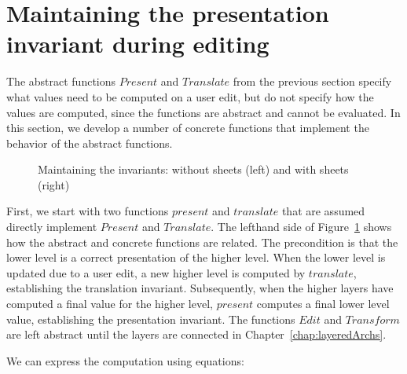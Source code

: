 %																
%																
%																
\section{Maintaining the presentation invariant during editing}

The abstract functions $Present$ and $Translate$ from the previous section specify what values need to be computed on a user edit, but do not specify how the values are computed, since the functions are abstract and cannot be evaluated. In this section, we develop a number of concrete  functions that implement the behavior of the abstract functions.

\begin{figure}
\begin{center}
\begin{center}
 
\end{center}
\caption{Maintaining the invariants: without sheets (left) and with sheets (right)}\label{maintainingInvs} 
\end{center}
\end{figure}

First, we start with two functions $present$ and $translate$ that are assumed directly implement $Present$ and $Translate$. The lefthand side of Figure~\ref{maintainingInvs} shows how the abstract and concrete functions are related. The precondition is that the lower level is a correct presentation of the higher level. When the lower level is updated due to a user edit, a new higher level is computed by $translate$, establishing the translation invariant. Subsequently, when the higher layers have computed a final value for the higher level, $present$ computes a final lower level value, establishing the presentation invariant. The functions $Edit$ and $Transform$ are left abstract until the layers are connected in Chapter~\ref{chap:layeredArchs}.

We can express the computation using equations:

